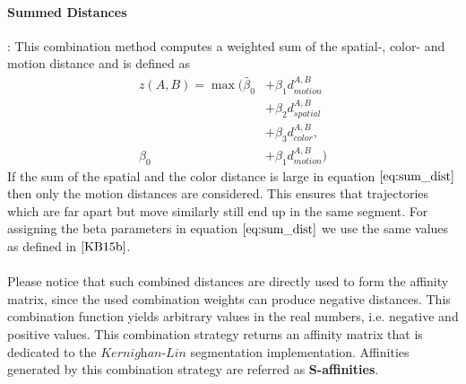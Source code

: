 \paragraph{Summed Distances}: This combination method computes a weighted sum of the spatial-, color- and motion distance and is defined as
\begin{equation}
\begin{aligned}
z ( A, B ) = \max (\tilde{\beta_0} & + \beta_1 d_{motion}^{A,B} \\
& + \beta_2 d_{spatial}^{A,B} \\
& + \beta_3 d_{color}^{A,B},\\
\beta_0 & + \beta_1 d_{motion}^{A,B} )
\end{aligned}
\label{eq:sum_dist}
\end{equation}
If the sum of the spatial and the color distance is large in equation $\ref{eq:sum_dist}$ then only the motion distances are considered. This ensures that trajectories which are far apart but move similarly still end up in the same segment. For assigning the beta parameters in equation $\ref{eq:sum_dist}$ we use the same values as defined in $\cite{KB15b}$.\\ \\
Please notice that such combined distances are directly used to form the affinity matrix, since the used combination weights can produce negative distances. This combination function yields arbitrary values in the real numbers, i.e. negative and positive values. This combination strategy returns an affinity matrix that is dedicated to the $\textit{Kernighan-Lin}$ segmentation implementation. Affinities generated by this combination strategy are referred as \textbf{S-affinities}.
 
